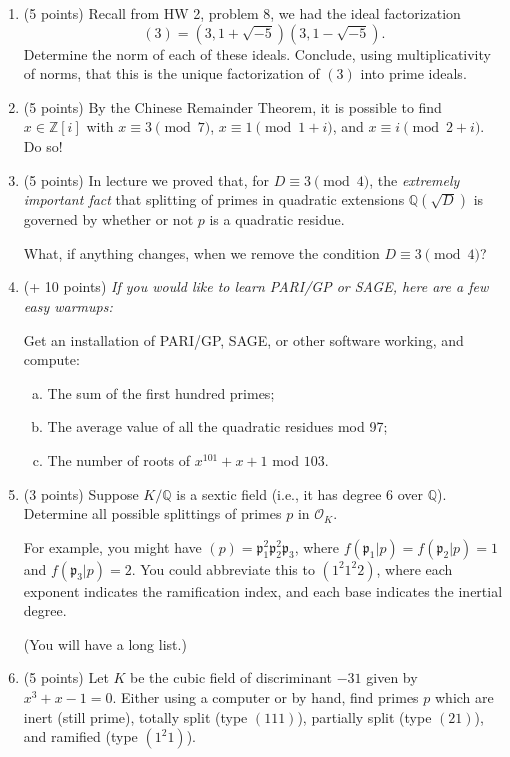 \documentclass[12pt]{article}
\newcommand{\p}{\mathfrak{p}}
\newcommand{\Q}{\mathbb{Q}}
\newcommand{\Z}{\mathbb{Z}}
\begin{document}
\begin{enumerate}
\item (5 points)
Recall from HW 2, problem 8, we had the ideal factorization
\[
(3) = (3, 1 + \sqrt{-5})(3, 1 - \sqrt{-5}).
\]
Determine the norm of each of these ideals. Conclude, using multiplicativity of norms, that this is
the unique factorization of $(3)$ into prime ideals.

\item (5 points)
By the Chinese Remainder Theorem, it is possible to find $x \in \Z[i]$ with $x \equiv 3 \pmod{7}$,
$x \equiv 1 \pmod{1 + i}$, and $x \equiv i \pmod{2 + i}$. Do so!

\item (5 points)
In lecture we proved that, for $D \equiv 3 \pmod{4}$, the {\itshape extremely important fact} that 
splitting of primes in quadratic extensions $\Q(\sqrt{D})$ is governed
by whether or not $p$ is a quadratic residue. 

What, if anything changes, when we remove the condition $D \equiv 3 \pmod{4}$?

\item (+ 10 points)
{\itshape If you would like to learn PARI/GP or SAGE, here are a few easy warmups:}

Get an installation of PARI/GP, SAGE, or other software working, and compute:
\begin{enumerate}[(a)]
\item 
The sum of the first hundred primes;
\item
The average value of all the quadratic residues mod 97;
\item
The number of roots of $x^{101} + x + 1$ mod $103$.
\end{enumerate}

\item (3 points)
Suppose $K/\Q$ is a sextic field (i.e., it has degree 6 over $\Q$). Determine all possible splittings
of primes $p$ in $\mathcal{O}_K$.

For example, you might have $(p) = \p_1^2 \p_2^2 \p_3$, where $f(\p_1 | p) = f(\p_2 | p) = 1$
and $f(\p_3 | p) = 2$. You could abbreviate this to $(1^2 1^2 2)$, where each exponent indicates the ramification
index, and each base indicates the inertial degree.

(You will have a long list.)

\item (5 points)
Let $K$ be the cubic field of discriminant $-31$ given by $x^3 + x - 1 = 0$. Either using a computer or by 
hand, find primes $p$ which are inert (still prime), totally split (type $(111)$), partially split (type $(21)$),
and ramified (type $(1^2 1)$).


\end{enumerate}
\end{document}
